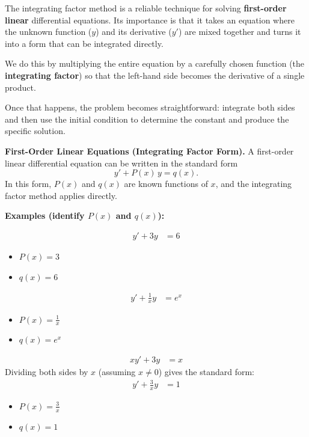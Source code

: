 \documentclass[11pt]{article}
\begin{document}
The integrating factor method is a reliable technique for solving \textbf{first-order linear} differential equations. Its importance is
that it takes an equation where the unknown function ($y$) and its derivative ($y'$) are mixed together and turns it into a form that can be
integrated directly.

We do this by multiplying the entire equation by a carefully chosen function (the \textbf{integrating factor}) so that the left-hand
side becomes the derivative of a single product.

Once that happens, the problem becomes straightforward: integrate both sides and then use the initial condition to determine the constant and
produce the specific solution.

\noindent\textbf{First-Order Linear Equations (Integrating Factor Form).}
A first-order linear differential equation can be written in the standard form
\[
y' + P(x)\,y = q(x).
\]
In this form, $P(x)$ and $q(x)$ are known functions of $x$, and the integrating factor method applies directly.

\medskip
\noindent\textbf{Examples (identify $P(x)$ and $q(x)$):}

\begin{align*}
y' + 3y &= 6
\end{align*}
\begin{itemize}
  \item $P(x)=3$
  \item $q(x)=6$
\end{itemize}

\begin{align*}
y' + \frac{1}{x}y &= e^{x}
\end{align*}
\begin{itemize}
  \item $P(x)=\frac{1}{x}$
  \item $q(x)=e^{x}$
\end{itemize}

\begin{align*}
xy' + 3y &= x
\end{align*}
\noindent Dividing both sides by $x$ (assuming $x\neq 0$) gives the standard form:
\begin{align*}
y' + \frac{3}{x}y &= 1
\end{align*}
\begin{itemize}
  \item $P(x)=\frac{3}{x}$
  \item $q(x)=1$
\end{itemize}
\end{document}
